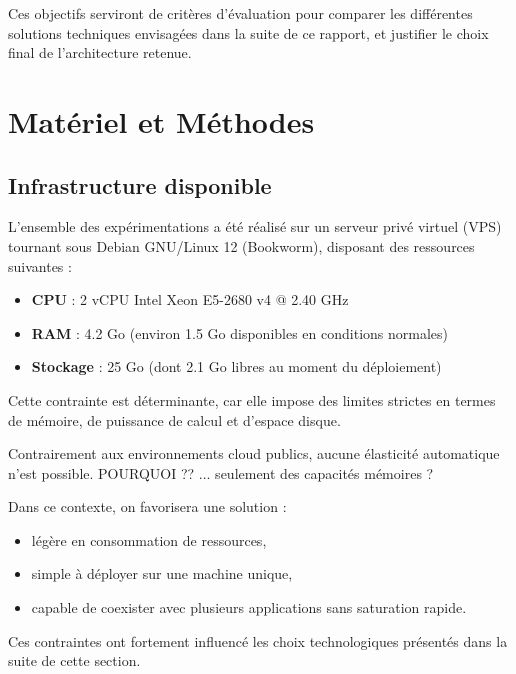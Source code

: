 \documentclass{rapportClass} %
\begin{document}
Ces objectifs serviront de critères d’évaluation pour comparer les
différentes solutions techniques envisagées dans la suite de ce
rapport, et justifier le choix final de l’architecture retenue.


\chapter{Matériel et Méthodes}

\section{Infrastructure disponible}

L'ensemble des expérimentations a été réalisé sur un serveur privé
virtuel (VPS) tournant sous Debian GNU/Linux 12 (Bookworm), 
disposant des ressources suivantes :

\begin{itemize}[label=$\bullet$] 
    \item \textbf{CPU} : 2 vCPU Intel Xeon E5-2680 v4 @ 2.40 GHz
    \item \textbf{RAM} : 4.2 Go (environ 1.5 Go disponibles en conditions normales)
    \item \textbf{Stockage} : 25 Go (dont 2.1 Go libres au moment du déploiement)
\end{itemize}

\vspace{0.5cm}

Cette contrainte est déterminante, car elle impose des limites strictes
en termes de mémoire, de puissance de calcul et d’espace disque.

\smallskip
Contrairement aux environnements cloud publics, aucune élasticité
automatique n’est possible.
{\color{red} POURQUOI ?? ... seulement des capacités mémoires  ?}

\smallskip
Dans ce contexte, on favorisera une solution :
\begin{itemize}
\item légère en consommation de ressources,
\item simple à déployer sur une machine unique,
\item capable de coexister avec plusieurs applications sans saturation rapide.
\end{itemize}

Ces contraintes ont fortement influencé les choix technologiques
présentés dans la suite de cette section.
\end{document}

